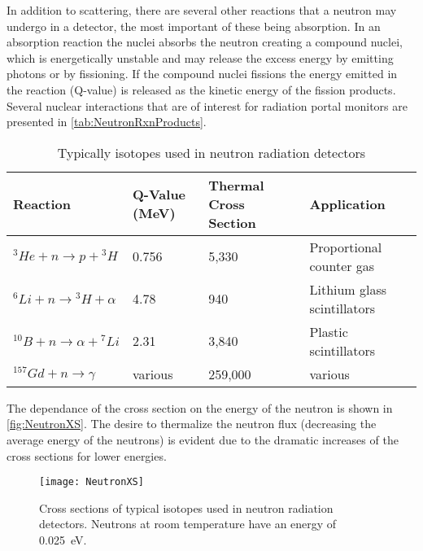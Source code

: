 In addition to scattering, there are several other reactions that a neutron may undergo in a detector, the most important of these being absorption.
In an absorption reaction the nuclei absorbs the neutron creating a compound nuclei, which is energetically unstable and may release the excess energy by emitting photons or by fissioning.
If the compound nuclei fissions the energy emitted in the reaction (Q-value) is released as the kinetic energy of the fission products.
Several nuclear interactions that are of interest for radiation portal monitors are presented in \autoref{tab:NeutronRxnProducts}.
\begin{table}
	\caption[Neutron Reactions and Reaction Energies]{Typically isotopes used in neutron radiation detectors}
	\label{tab:NeutronRxnProducts}
	\centering
	\begin{tabular}{ m{4cm} | m{1.5cm} m{1.5cm} p{5.5cm}} 
		\toprule
		Reaction                           & Q-Value (MeV) & Thermal Cross Section & Application \\
		\midrule
		${}^3He + n \to p +{}^3H$          & 0.756     & 5,330 & Proportional counter gas \\
		${}^6Li + n \to {}^3H + \alpha$    & 4.78      & 940 & Lithium glass scintillators \\
		${}^{10}B + n \to \alpha + {}^7Li$ & 2.31      & 3,840 & Plastic scintillators \\
		${}^{157}Gd + n \to \gamma$        &various    & 259,000 & various \\
		\bottomrule
	\end{tabular}
\end{table}
The dependance of the cross section on the energy of the neutron is shown in \autoref{fig:NeutronXS}.
The desire to thermalize the neutron flux (decreasing the average energy of the neutrons) is evident due to the dramatic increases of the cross sections for lower energies.
\begin{figure}
	\centering
	\texttt{[image: NeutronXS]}
	\caption[Neutron Reaction Cross Sections]{Cross sections of typical isotopes used in neutron radiation detectors.  Neutrons at room temperature have an energy of \SI{0.025}{\eV}.}
	\label{fig:NeutronXS}
\end{figure}
